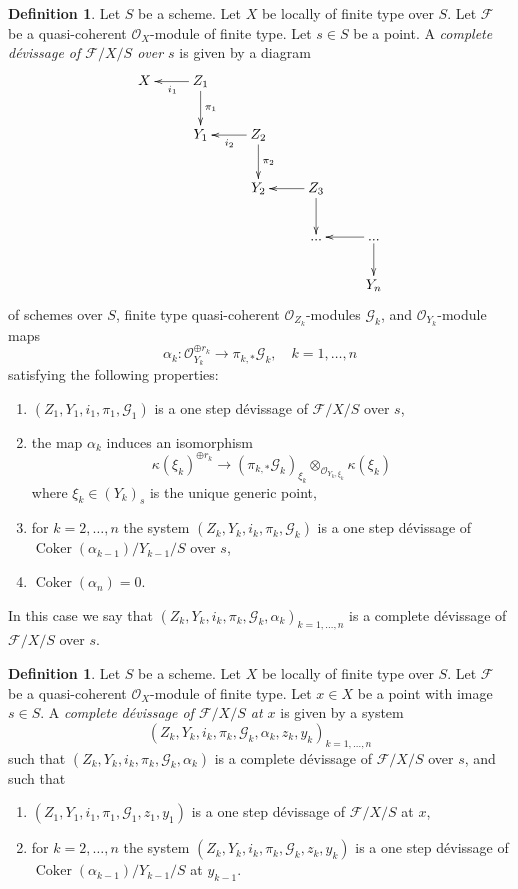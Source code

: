 \documentclass{amsart}
\theoremstyle{plain}
\theoremstyle{definition}
\newtheorem{definition}[subsection]{Definition}
\theoremstyle{remark}
\numberwithin{equation}{subsection}
\def\Coker{\mathop{\mathrm{Coker}}}
\begin{document}
\begin{definition}
\label{definition-complete-devissage}
Let $S$ be a scheme.
Let $X$ be locally of finite type over $S$.
Let $\mathcal{F}$ be a quasi-coherent $\mathcal{O}_X$-module of finite type.
Let $s \in S$ be a point.
A {\it complete d\'evissage of $\mathcal{F}/X/S$ over $s$} is given by a
diagram
$$
\xymatrix{
X & Z_1 \ar[l]^{i_1} \ar[d]^{\pi_1} \\
& Y_1 & Z_2 \ar[l]^{i_2} \ar[d]^{\pi_2} \\
& & Y_2 & Z_3 \ar[l] \ar[d] \\
& & & ... & ... \ar[l] \ar[d] \\
& & & & Y_n
}
$$
of schemes over $S$, finite type quasi-coherent $\mathcal{O}_{Z_k}$-modules
$\mathcal{G}_k$, and $\mathcal{O}_{Y_k}$-module maps
$$
\alpha_k :
\mathcal{O}_{Y_k}^{\oplus r_k}
\longrightarrow
\pi_{k, *}\mathcal{G}_k,
\quad
k = 1, \ldots, n
$$
satisfying the following properties:
\begin{enumerate}
\item $(Z_1, Y_1, i_1, \pi_1, \mathcal{G}_1)$ is a one step
d\'evissage of $\mathcal{F}/X/S$ over $s$,
\item the map $\alpha_k$ induces an isomorphism
$$
\kappa(\xi_k)^{\oplus r_k} \longrightarrow
(\pi_{k, *}\mathcal{G}_k)_{\xi_k}
\otimes_{\mathcal{O}_{Y_k, \xi_k}} \kappa(\xi_k)
$$
where $\xi_k \in (Y_k)_s$ is the unique generic point,
\item for $k = 2, \ldots, n$ the system
$(Z_k, Y_k, i_k, \pi_k, \mathcal{G}_k)$
is a one step d\'evissage of $\Coker(\alpha_{k - 1})/Y_{k - 1}/S$
over $s$,
\item $\Coker(\alpha_n) = 0$.
\end{enumerate}
In this case we say that
$(Z_k, Y_k, i_k, \pi_k, \mathcal{G}_k, \alpha_k)_{k = 1, \ldots, n}$
is a complete d\'evissage of $\mathcal{F}/X/S$ over $s$.
\end{definition}

\begin{definition}
\label{definition-complete-devissage-at-x}
Let $S$ be a scheme.
Let $X$ be locally of finite type over $S$.
Let $\mathcal{F}$ be a quasi-coherent $\mathcal{O}_X$-module of finite type.
Let $x \in X$ be a point with image $s \in S$.
A {\it complete d\'evissage of $\mathcal{F}/X/S$ at $x$} is given by a
system
$$
(Z_k, Y_k, i_k, \pi_k, \mathcal{G}_k, \alpha_k, z_k, y_k)_{k = 1, \ldots, n}
$$
such that $(Z_k, Y_k, i_k, \pi_k, \mathcal{G}_k, \alpha_k)$ is a
complete d\'evissage of $\mathcal{F}/X/S$ over $s$, and such that
\begin{enumerate}
\item $(Z_1, Y_1, i_1, \pi_1, \mathcal{G}_1, z_1, y_1)$ is a one step
d\'evissage of $\mathcal{F}/X/S$ at $x$,
\item for $k = 2, \ldots, n$ the system
$(Z_k, Y_k, i_k, \pi_k, \mathcal{G}_k, z_k, y_k)$
is a one step d\'evissage of $\Coker(\alpha_{k - 1})/Y_{k - 1}/S$
at $y_{k - 1}$.
\end{enumerate}
\end{definition}
\end{document}
